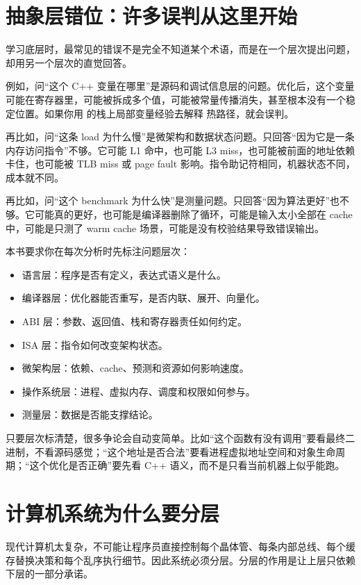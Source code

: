 \section{抽象层错位：许多误判从这里开始}

学习底层时，最常见的错误不是完全不知道某个术语，而是在一个层次提出问题，却用另一个层次的直觉回答。

例如，问“这个 C++ 变量在哪里”是源码和调试信息层的问题。优化后，这个变量可能在寄存器里，可能被拆成多个值，可能被常量传播消失，甚至根本没有一个稳定位置。如果你用  的栈上局部变量经验去解释  热路径，就会误判。

再比如，问“这条 load 为什么慢”是微架构和数据状态问题。只回答“因为它是一条内存访问指令”不够。它可能 L1 命中，也可能 L3 miss，也可能被前面的地址依赖卡住，也可能被 TLB miss 或 page fault 影响。指令助记符相同，机器状态不同，成本就不同。

再比如，问“这个 benchmark 为什么快”是测量问题。只回答“因为算法更好”也不够。它可能真的更好，也可能是编译器删除了循环，可能是输入太小全部在 cache 中，可能是只测了 warm cache 场景，可能是没有校验结果导致错误输出。

本书要求你在每次分析时先标注问题层次：

\begin{itemize}
  \item 语言层：程序是否有定义，表达式语义是什么。
  \item 编译器层：优化器能否重写，是否内联、展开、向量化。
  \item ABI 层：参数、返回值、栈和寄存器责任如何约定。
  \item ISA 层：指令如何改变架构状态。
  \item 微架构层：依赖、cache、预测和资源如何影响速度。
  \item 操作系统层：进程、虚拟内存、调度和权限如何参与。
  \item 测量层：数据是否能支撑结论。
\end{itemize}

只要层次标清楚，很多争论会自动变简单。比如“这个函数有没有调用”要看最终二进制，不看源码感觉；“这个地址是否合法”要看进程虚拟地址空间和对象生命周期；“这个优化是否正确”要先看 C++ 语义，而不是只看当前机器上似乎能跑。

\section{计算机系统为什么要分层}

现代计算机太复杂，不可能让程序员直接控制每个晶体管、每条内部总线、每个缓存替换决策和每个乱序执行细节。因此系统必须分层。分层的作用是让上层只依赖下层的一部分承诺。

